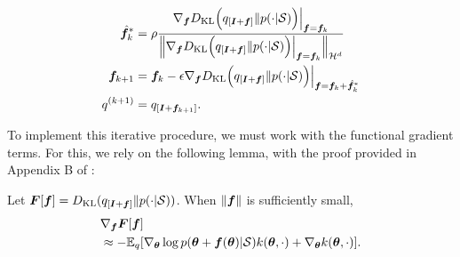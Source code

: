 

\begin{align}
    \label{eq: functional perturbation}
    \hat{{\bm{f}}}^*_k &= \rho\frac{\nabla_{{\bm{f}}}D_{\mathrm{KL}}\Big(q_{[{\bm{I}} + {\bm{f}}]} \| p(\cdot|{\mathcal{S}})\Big)\Big|_{{\bm{f}} = {\bm{f}}_k}}{\Big\| \nabla_{{\bm{f}}}D_{\mathrm{KL}}\Big(q_{[{\bm{I}} + {\bm{f}}]} \| p(\cdot|{\mathcal{S}})\Big)\Big|_{{\bm{f}} = {\bm{f}}_k} \Big\|_{{\mathcal{H}}^d}}\\ 
    \label{eq: functional descend}
    {\bm{f}}_{k+1} &={\bm{f}}_k -\epsilon \nabla_{{\bm{f}}}D_{\mathrm{KL}}\Big(q_{[{\bm{I}} + {\bm{f}}]} \| p(\cdot|{\mathcal{S}})\Big) \Big|_{{\bm{f}} = {\bm{f}}_k +  \hat{{\bm{f}}}^*_k} \\
    q^{(k+1)} & = q_{[{\bm{I}} + {\bm{f}}_{k+1}]}. 
\end{align}


To implement this iterative procedure, we must work with the functional gradient terms. For this, we rely on the following lemma, with the proof provided in Appendix B of \citet{svgd}:
\begin{lemma}
\label{theorem: functional gradient on RKHS}
Let ${\bm{F}}[{\bm{f}}]=D_{\mathrm{KL}}(q_{[{\bm{I}} + {\bm{f}}]}\|p(\cdot | {\mathcal{S}}))$. When $\|{\bm{f}}\|$ is sufficiently small,
    \begin{align}
        &\nabla_{{\bm{f}}} {\bm{F}}[{\bm{f}}] \\
        &\approx -\mathbb{E}_q[\nabla_{\bm{\theta}} \log p({\bm{\theta}}+{\bm{f}}({\bm{\theta}})| {\mathcal{S}})k({\bm{\theta}},\cdot)+\nabla_{\bm{\theta}} k({\bm{\theta}},\cdot)].
    \end{align}
\end{lemma}

